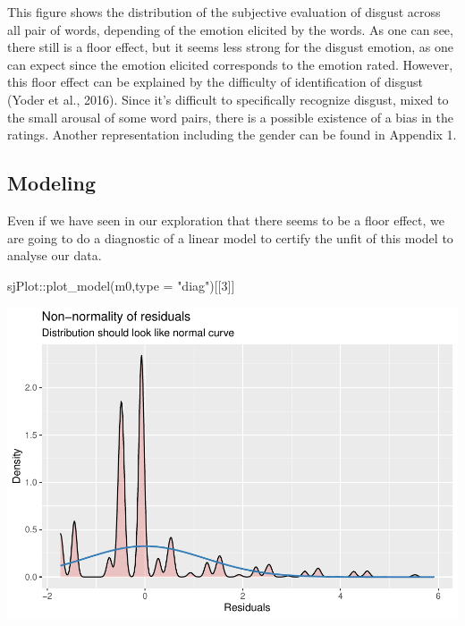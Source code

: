 \documentclass[
]{article}
\newenvironment{Shaded}{\begin{snugshade}}{\end{snugshade}}
\newcommand{\AttributeTok}[1]{\textcolor[rgb]{0.77,0.63,0.00}{#1}}
\newcommand{\DecValTok}[1]{\textcolor[rgb]{0.00,0.00,0.81}{#1}}
\newcommand{\FunctionTok}[1]{\textcolor[rgb]{0.00,0.00,0.00}{#1}}
\newcommand{\NormalTok}[1]{#1}
\newcommand{\SpecialCharTok}[1]{\textcolor[rgb]{0.00,0.00,0.00}{#1}}
\newcommand{\StringTok}[1]{\textcolor[rgb]{0.31,0.60,0.02}{#1}}
\begin{document}
This figure shows the distribution of the subjective evaluation of
disgust across all pair of words, depending of the emotion elicited by
the words. As one can see, there still is a floor effect, but it seems
less strong for the disgust emotion, as one can expect since the emotion
elicited corresponds to the emotion rated. However, this floor effect
can be explained by the difficulty of identification of disgust (Yoder
et al., 2016). Since it's difficult to specifically recognize disgust,
mixed to the small arousal of some word pairs, there is a possible
existence of a bias in the ratings. Another representation including the
gender can be found in Appendix 1.

\hypertarget{modeling}{%
\subsection{Modeling}\label{modeling}}

Even if we have seen in our exploration that there seems to be a floor
effect, we are going to do a diagnostic of a linear model to certify the
unfit of this model to analyse our data.

\begin{Shaded}
\begin{Highlighting}[]
\NormalTok{sjPlot}\SpecialCharTok{::}\FunctionTok{plot\_model}\NormalTok{(m0,}\AttributeTok{type =} \StringTok{"diag"}\NormalTok{)[[}\DecValTok{3}\NormalTok{]]}
\end{Highlighting}
\end{Shaded}

\includegraphics{DAP_v4-1-22_files/figure-latex/normal analysis of resids-1.pdf}
\end{document}
